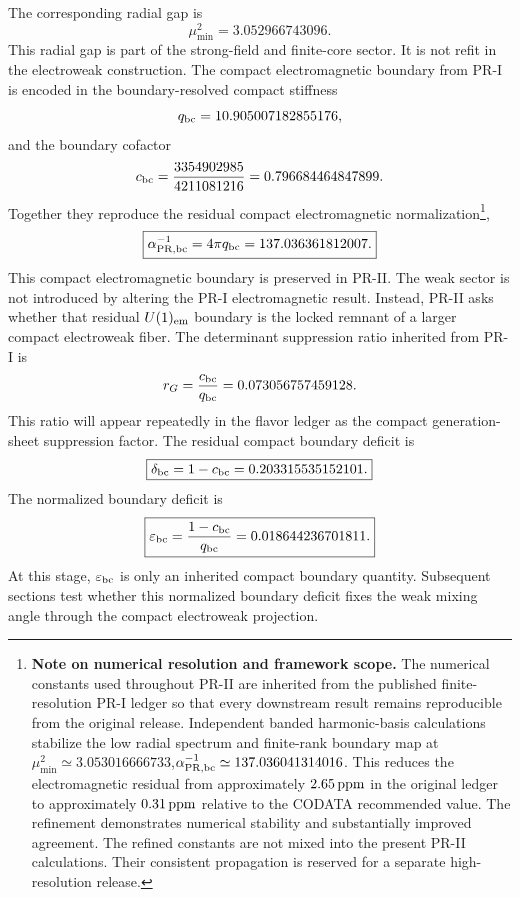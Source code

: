 \documentclass[11pt]{article}
\begin{document}
The corresponding radial gap is
\begin{equation}
\mu_{\min}^2
=
3.052966743096.
\end{equation}
This radial gap is part of the strong-field and finite-core sector. 
It is not refit in the electroweak construction. The compact electromagnetic boundary from PR-I is encoded in the boundary-resolved compact stiffness
\begin{equation}
q_{\rm bc} = 10.905007182855176,
\end{equation}
and the boundary cofactor
\begin{equation}
c_{\rm bc} = \frac{3354902985}{4211081216} = 0.796684464847899.
\end{equation}
Together they reproduce the residual compact electromagnetic normalization\footnote{\textbf{Note on numerical resolution and framework scope.}
The numerical constants used throughout PR-II are inherited from the published finite-resolution PR-I ledger so that every downstream result remains reproducible from the original release. Independent banded harmonic-basis calculations stabilize the low radial spectrum and finite-rank boundary map at $\mu_{\min}^2\simeq 3.053016666733$,\quad $\alpha_{\rm PR,bc}^{-1}\simeq 137.036041314016$. This reduces the electromagnetic residual from approximately \(2.65\,{\rm ppm}\) in the original ledger to approximately \(0.31\,{\rm ppm}\) relative to the CODATA recommended value. The refinement demonstrates numerical stability and substantially improved agreement. The refined constants are not mixed into the present PR-II calculations. Their consistent propagation is reserved for a separate high-resolution release.},
\begin{equation}
\boxed{
\alpha_{\rm PR,bc}^{-1}
=
4\pi q_{\rm bc}
=
137.036361812007.
}
\end{equation} 
This compact electromagnetic boundary is preserved in PR-II. 
The weak sector is not introduced by altering the PR-I electromagnetic result. 
Instead, PR-II asks whether that residual \(U(1)_{\rm em}\) boundary is the locked remnant of a larger compact electroweak fiber. The determinant suppression ratio inherited from PR-I is
\begin{equation}
r_G
=
\frac{c_{\rm bc}}{q_{\rm bc}}
=
0.073056757459128.
\end{equation}
This ratio will appear repeatedly in the flavor ledger as the compact generation-sheet suppression factor. The residual compact boundary deficit is
\begin{equation}
\boxed{
\delta_{\rm bc}
=
1-c_{\rm bc}
=
0.203315535152101.
}
\end{equation}
The normalized boundary deficit is
\begin{equation}
\boxed{
\varepsilon_{\rm bc}
=
\frac{1-c_{\rm bc}}{q_{\rm bc}}
=
0.018644236701811.
}
\end{equation}
At this stage, \(\varepsilon_{\rm bc}\) is only an inherited compact boundary quantity. 
Subsequent sections test whether this normalized boundary deficit fixes the weak mixing angle through the compact electroweak projection.
\end{document}
